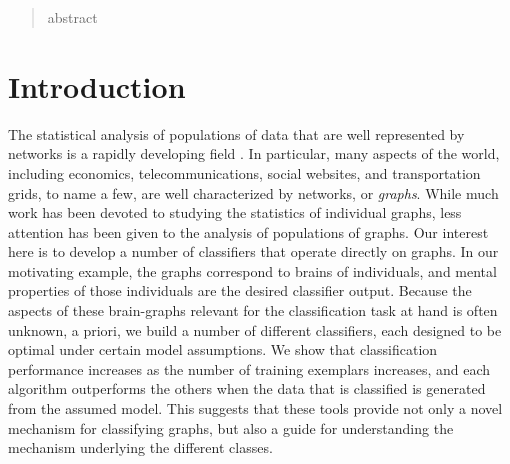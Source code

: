 \documentclass{article}
\begin{document}
 


\begin{abstract} 
abstract
\end{abstract} 

\section{Introduction} %
\label{sec:introduction}



The statistical analysis of populations of data that are well represented by networks is a rapidly developing field \cite{??}.  In particular, many aspects of the world, including economics, telecommunications, social websites, and transportation grids, to name a few, are well characterized by networks, or \emph{graphs}. While much work has been devoted to studying the statistics of individual graphs, less attention has been given to the analysis of populations of graphs.  Our interest here is to develop a number of classifiers that operate directly on graphs.  In our motivating example, the graphs correspond to brains of individuals, and mental properties of those individuals are the desired classifier output.  Because the aspects of these brain-graphs relevant for the classification task at hand is often unknown, a priori, we build a number of different classifiers, each designed to be optimal under certain model assumptions.  We show that classification performance increases as the number of training exemplars increases, and each algorithm outperforms the others when the data that is classified is generated from the assumed model.  This suggests that these tools provide not only a novel mechanism for classifying graphs, but also a guide for understanding the mechanism underlying the different classes.  
\end{document}
